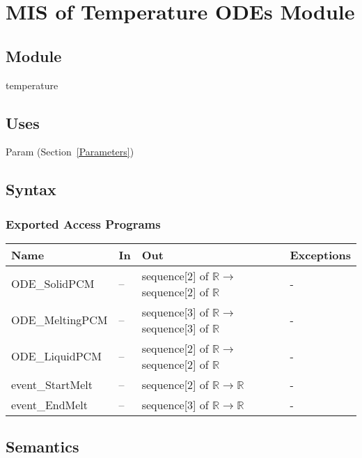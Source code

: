 \documentclass[12pt]{article}
\begin{document}
\newpage
\section{MIS of Temperature ODEs Module} \label{Temperature}

\subsection{Module}

temperature

\subsection{Uses}

Param (Section~\ref{Parameters})

\subsection{Syntax}

\subsubsection{Exported Access Programs}

\begin{center}
\begin{tabular}{p{3.5cm} p{1cm} p{7cm} p{2cm}}
\hline
\textbf{Name} & \textbf{In} & \textbf{Out} & \textbf{Exceptions} \\
\hline
ODE\_SolidPCM & -- & sequence[2] of $\mathbb{R} \rightarrow$ sequence[2] of $\mathbb{R}$ & - \\
\hline
ODE\_MeltingPCM & -- & sequence[3] of $\mathbb{R} \rightarrow$ sequence[3] of $\mathbb{R}$ & - \\
\hline
ODE\_LiquidPCM & -- & sequence[2] of $\mathbb{R} \rightarrow$ sequence[2] of $\mathbb{R}$ & - \\
\hline
event\_StartMelt & -- & sequence[2] of $\mathbb{R} \rightarrow \mathbb{R}$ & - \\
\hline
event\_EndMelt & -- & sequence[3] of $\mathbb{R} \rightarrow \mathbb{R}$ & - \\
\hline
\end{tabular}
\end{center}

\subsection{Semantics}
\end{document}
